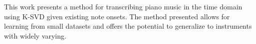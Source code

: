 This work presents a method for transcribing piano music in the time domain using \ac{K-SVD} given existing note onsets. The method presented allows for learning from small datasets and offers the potential to generalize to instruments with widely varying.
